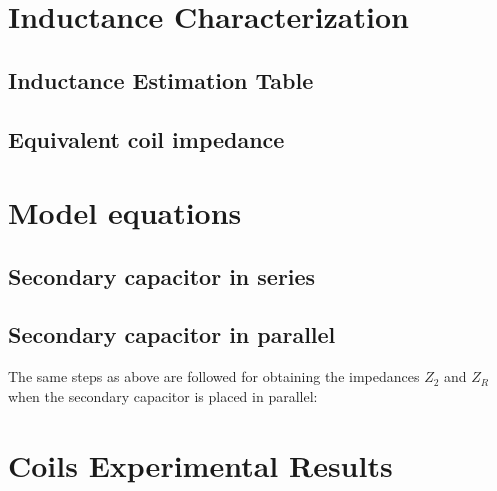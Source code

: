 \chapter{Inductance Characterization}\label{Appendix: AA}
\section{Inductance Estimation Table}



\section{Equivalent coil impedance} \label{AppendixSection: impedance}






\chapter{Model equations} \label{Appendix: A}
\section{Secondary capacitor in series} \label{sec:secondaryS}



\section{Secondary capacitor in parallel}\label{sec:secondaryP}

The same steps as above are followed for obtaining the impedances $Z_2$ and $Z_R$ when the secondary capacitor is placed in parallel: 









\chapter{Coils Experimental Results}
